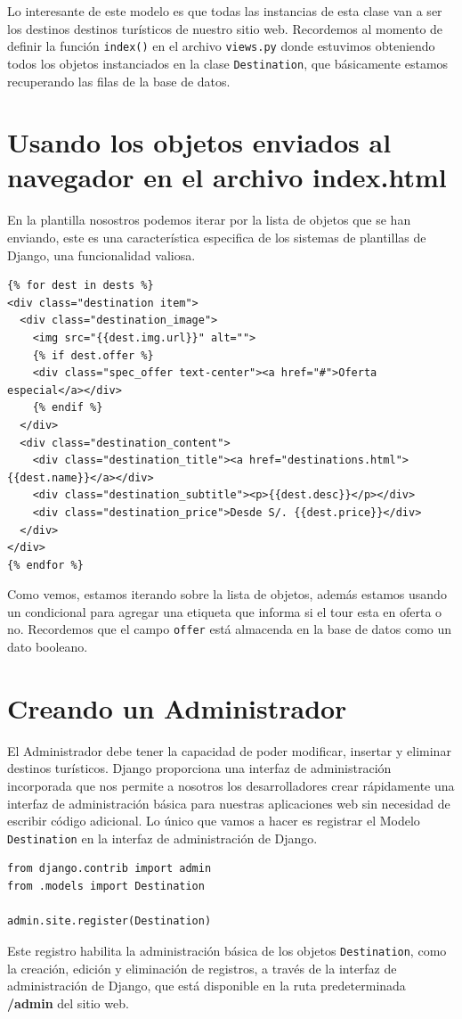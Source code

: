\documentclass[10pt, a4paper]{article}
\newcommand{\mpy}[1]{\texttt{#1}}
\begin{document}
Lo interesante de este modelo es que todas las instancias de esta clase van a ser los destinos destinos turísticos de nuestro sitio web. Recordemos al momento de definir la función \mpy{index()} en el archivo \mpy{views.py} donde estuvimos obteniendo todos los objetos instanciados en la clase \mpy{Destination}, que básicamente estamos recuperando las filas de la base de datos.

\section{Usando los objetos enviados al navegador en el archivo index.html}
En la plantilla nosostros podemos iterar por la lista de objetos que se han enviando, este es una característica especifica de los sistemas de plantillas de Django, una funcionalidad valiosa.

\begin{verbatim}
{% for dest in dests %}
<div class="destination item">
  <div class="destination_image">
    <img src="{{dest.img.url}}" alt="">
    {% if dest.offer %}
    <div class="spec_offer text-center"><a href="#">Oferta especial</a></div>
    {% endif %}
  </div>
  <div class="destination_content">
    <div class="destination_title"><a href="destinations.html">{{dest.name}}</a></div>
    <div class="destination_subtitle"><p>{{dest.desc}}</p></div>
    <div class="destination_price">Desde S/. {{dest.price}}</div>
  </div>
</div>
{% endfor %}
\end{verbatim}

Como vemos, estamos iterando sobre la lista de objetos, además estamos usando un condicional para agregar una etiqueta que informa si el tour esta en oferta o no. Recordemos que el campo \mpy{offer} está almacenda en la base de datos como un dato booleano.

\section{Creando un Administrador}
El Administrador debe tener la capacidad de poder modificar, insertar y eliminar destinos turísticos. Django proporciona una interfaz de administración incorporada que nos permite a nosotros los desarrolladores crear rápidamente una interfaz de administración básica para nuestras aplicaciones web sin necesidad de escribir código adicional.
\singlespacing
Lo único que vamos a hacer es registrar el Modelo \mpy{Destination} en la interfaz de administración de Django. 

\begin{verbatim}
from django.contrib import admin
from .models import Destination

admin.site.register(Destination)
\end{verbatim}

Este registro habilita la administración básica de los objetos \mpy{Destination}, como la creación, edición y eliminación de registros, a través de la interfaz de administración de Django, que está disponible en la ruta predeterminada \textbf{/admin} del sitio web.
\end{document}
